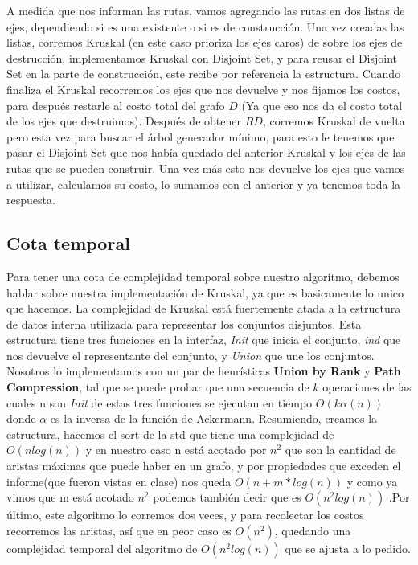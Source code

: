 A medida que nos informan las rutas, vamos agregando las rutas en dos listas de ejes, dependiendo si es una existente o si es de construcción. Una vez creadas las listas, corremos Kruskal (en este caso prioriza los ejes caros) de sobre los ejes de destrucción, implementamos Kruskal con Disjoint Set, y para reusar el Disjoint Set en la parte de construcción, este recibe por referencia la estructura. Cuando finaliza el Kruskal recorremos los ejes que nos devuelve y nos fijamos los costos, para después restarle al costo total del grafo $D$ (Ya que eso nos da el costo total de los ejes que destruimos). Después de obtener $RD$, corremos Kruskal de vuelta pero esta vez para buscar el árbol generador mínimo, para esto le tenemos que pasar el Disjoint Set que nos había quedado del anterior Kruskal  y los ejes de las rutas que se pueden construir. Una vez más esto nos devuelve los ejes que vamos a utilizar, calculamos su costo, lo sumamos con el anterior y ya tenemos toda la respuesta.

\subsection{Cota temporal}

Para tener una cota de complejidad temporal sobre nuestro algoritmo, debemos hablar sobre nuestra implementación de Kruskal, ya que es basicamente lo unico que hacemos.
La complejidad de Kruskal está fuertemente atada a la estructura de datos interna utilizada para representar los conjuntos disjuntos. Esta estructura tiene tres funciones en la interfaz, \textit{Init} que inicia el conjunto, \textit{ind} que nos devuelve el representante del conjunto, y \textit{Union} que une los conjuntos. Nosotros lo implementamos con un par de heurísticas \textbf{Union by Rank} y \textbf{Path Compression}, tal que se puede probar que una secuencia de $k$ operaciones de las cuales n son \textit{Init} de estas tres funciones se ejecutan en tiempo $O(k\alpha (n))$ donde $\alpha$ es la inversa de la función de Ackermann. Resumiendo, creamos la estructura, hacemos el sort de la std que tiene una complejidad de $O(nlog(n))$ y en nuestro caso n está acotado por $n^2$ que son la cantidad de aristas máximas que puede haber en un grafo, y por propiedades que exceden el informe(que fueron vistas en clase) nos queda $O(n + m*log(n))$ y como ya vimos que m está acotado $n^2$ podemos también decir que es $O(n^2log(n))$ .Por último, este algoritmo lo corremos dos veces, y para recolectar los costos recorremos las aristas, así que en peor caso es $O(n^2)$, quedando una complejidad temporal del algoritmo de $O(n^2log(n))$ que se ajusta a lo pedido.

